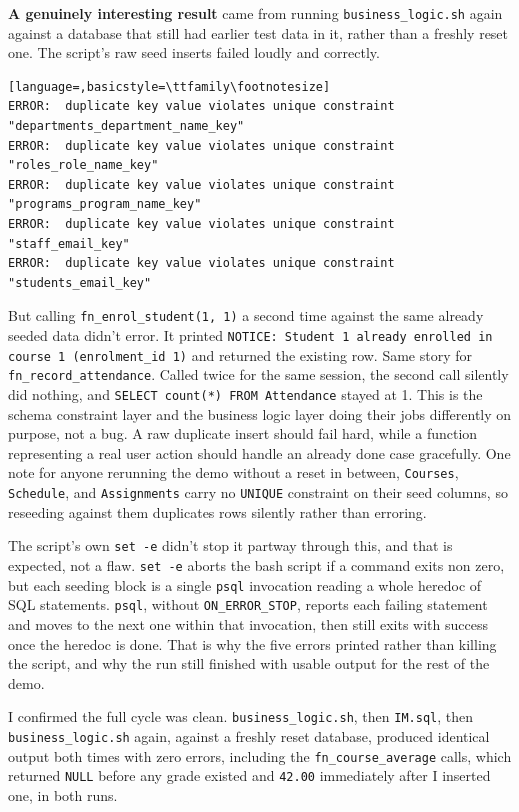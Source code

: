\documentclass[12pt,a4paper]{article}
\begin{document}
\noindent\textbf{A genuinely interesting result} came from running \lstinline|business_logic.sh| again against a database that still had earlier test data in it, rather than a freshly reset one. The script's raw seed inserts failed loudly and correctly.

\begin{lstlisting}[language=,basicstyle=\ttfamily\footnotesize]
ERROR:  duplicate key value violates unique constraint "departments_department_name_key"
ERROR:  duplicate key value violates unique constraint "roles_role_name_key"
ERROR:  duplicate key value violates unique constraint "programs_program_name_key"
ERROR:  duplicate key value violates unique constraint "staff_email_key"
ERROR:  duplicate key value violates unique constraint "students_email_key"
\end{lstlisting}

But calling \lstinline|fn_enrol_student(1, 1)| a second time against the same already seeded data didn't error. It printed \lstinline|NOTICE: Student 1 already enrolled in course 1 (enrolment_id 1)| and returned the existing row. Same story for \lstinline|fn_record_attendance|. Called twice for the same session, the second call silently did nothing, and \lstinline|SELECT count(*) FROM Attendance| stayed at 1. This is the schema constraint layer and the business logic layer doing their jobs differently on purpose, not a bug. A raw duplicate insert should fail hard, while a function representing a real user action should handle an already done case gracefully. One note for anyone rerunning the demo without a reset in between, \lstinline|Courses|, \lstinline|Schedule|, and \lstinline|Assignments| carry no \lstinline|UNIQUE| constraint on their seed columns, so reseeding against them duplicates rows silently rather than erroring.

The script's own \lstinline|set -e| didn't stop it partway through this, and that is expected, not a flaw. \lstinline|set -e| aborts the bash script if a command exits non zero, but each seeding block is a single \lstinline|psql| invocation reading a whole heredoc of SQL statements. \lstinline|psql|, without \lstinline|ON_ERROR_STOP|, reports each failing statement and moves to the next one within that invocation, then still exits with success once the heredoc is done. That is why the five errors printed rather than killing the script, and why the run still finished with usable output for the rest of the demo.

I confirmed the full cycle was clean. \lstinline|business_logic.sh|, then \lstinline|IM.sql|, then \lstinline|business_logic.sh| again, against a freshly reset database, produced identical output both times with zero errors, including the \lstinline|fn_course_average| calls, which returned \lstinline|NULL| before any grade existed and \lstinline|42.00| immediately after I inserted one, in both runs.
\end{document}
